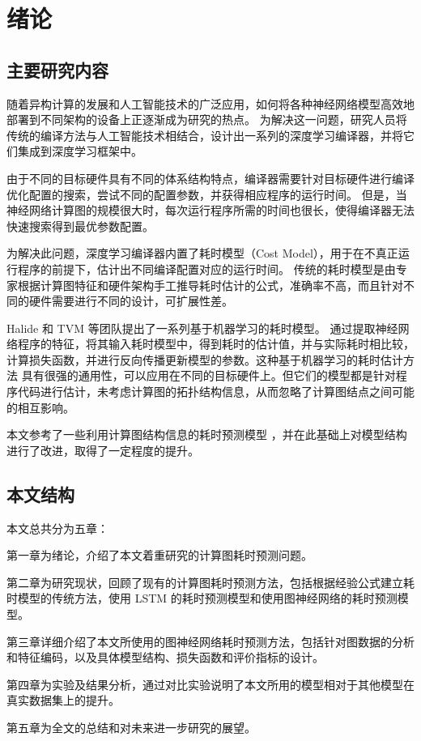 
\chapter{绪论}

\section{主要研究内容}
随着异构计算的发展和人工智能技术的广泛应用，如何将各种神经网络模型高效地部署到不同架构的设备上正逐渐成为研究的热点\cite{DLcompiler}。
为解决这一问题，研究人员将传统的编译方法与人工智能技术相结合，设计出一系列的深度学习编译器，并将它们集成到深度学习框架中。

由于不同的目标硬件具有不同的体系结构特点，编译器需要针对目标硬件进行编译优化配置的搜索，尝试不同的配置参数，并获得相应程序的运行时间。
但是，当神经网络计算图的规模很大时，每次运行程序所需的时间也很长，使得编译器无法快速搜索得到最优参数配置。

为解决此问题，深度学习编译器内置了耗时模型（Cost Model），用于在不真正运行程序的前提下，估计出不同编译配置对应的运行时间。
传统的耗时模型是由专家根据计算图特征和硬件架构手工推导耗时估计的公式，准确率不高，而且针对不同的硬件需要进行不同的设计，可扩展性差。

Halide \cite{Adams2019LearningTO} 和 TVM \cite{DBLP:journals/corr/abs-1805-08166} 等团队提出了一系列基于机器学习的耗时模型。
通过提取神经网络程序的特征，将其输入耗时模型中，得到耗时的估计值，并与实际耗时相比较，计算损失函数，并进行反向传播更新模型的参数。这种基于机器学习的耗时估计方法
具有很强的通用性，可以应用在不同的目标硬件上。但它们的模型都是针对程序代码进行估计，未考虑计算图的拓扑结构信息，从而忽略了计算图结点之间可能的相互影响。

本文参考了一些利用计算图结构信息的耗时预测模型\cite{haikang} \cite{GCN2}  \cite{Alearned}，并在此基础上对模型结构进行了改进，取得了一定程度的提升。

\section{本文结构}
本文总共分为五章：

第一章为绪论，介绍了本文着重研究的计算图耗时预测问题。

第二章为研究现状，回顾了现有的计算图耗时预测方法，包括根据经验公式建立耗时模型的传统方法，使用 LSTM 的耗时预测模型和使用图神经网络的耗时预测模型。

第三章详细介绍了本文所使用的图神经网络耗时预测方法，包括针对图数据的分析和特征编码，以及具体模型结构、损失函数和评价指标的设计。

第四章为实验及结果分析，通过对比实验说明了本文所用的模型相对于其他模型在真实数据集上的提升。

第五章为全文的总结和对未来进一步研究的展望。
